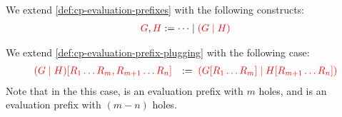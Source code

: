 \begin{definition}\label{def:nc-evaluation-prefixes}
  We extend \cref{def:cp-evaluation-prefixes} with the following constructs:
  \begin{align*}
    \textcolor{red}{G}, \textcolor{red}{H} := \dots \mid \textcolor{red}{(G \mid H)}
  \end{align*}
\end{definition}
\begin{definition}[Plugging]\label{def:nc-evaluation-prefix-plugging}
  We extend \cref{def:cp-evaluation-prefix-plugging} with the following case:
  \[
    \begin{array}{ll}
      \textcolor{red}{{(G \mid H)}[{R_1 \dots R_m, R_{m+1} \dots R_{n}}]}
                            & := \; \textcolor{red}{({G}[{R_1 \dots R_m}] \mid {H}[{R_{m+1} \dots R_n}])}
    \end{array}
  \]
  Note that in the this case,  is an evaluation prefix with $m$ holes,
  and  is an evaluation prefix with $(m-n)$ holes.
\end{definition}
